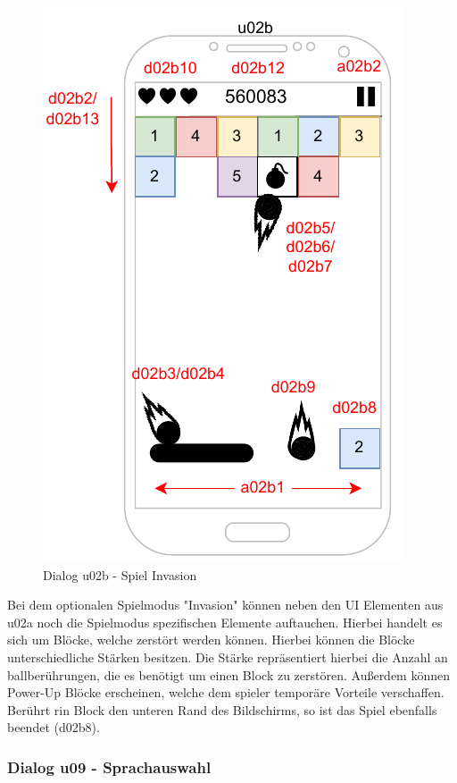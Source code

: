 \begin{figure}
    \begin{center}
    \includegraphics{diagramme/pdf/Mockup-u02b.pdf}
\end{center}
    \caption{Dialog u02b - Spiel Invasion}
\end{figure}

Bei dem optionalen Spielmodus "Invasion" können neben den UI Elementen aus u02a noch die Spielmodus spezifischen Elemente auftauchen. 
Hierbei handelt es sich um Blöcke, welche zerstört werden können. Hierbei können die Blöcke unterschiedliche Stärken besitzen. 
Die Stärke repräsentiert hierbei die Anzahl an \gls{ball}berührungen, die es benötigt um einen Block zu zerstören. Außerdem können Power-Up Blöcke
erscheinen, welche dem \gls{spieler} temporäre Vorteile verschaffen. Berührt rin Block den unteren Rand des Bildschirms, so ist das Spiel ebenfalls beendet (d02b8).
\clearpage

\subsubsection{Dialog u09 - Sprachauswahl}

